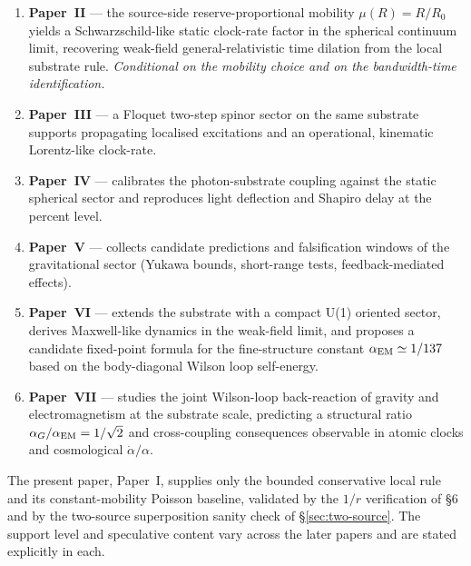 \documentclass[11pt,a4paper]{article}
\begin{document}
\begin{enumerate}
\item \textbf{Paper~II} --- the source-side reserve-proportional
mobility $\mu(R) = R/R_0$ yields a Schwarzschild-like static
clock-rate factor in the spherical continuum limit, recovering
weak-field general-relativistic time dilation from the local
substrate rule. \emph{Conditional on the mobility choice and
on the bandwidth-time identification.}
\item \textbf{Paper~III} --- a Floquet two-step spinor sector
on the same substrate supports propagating localised
excitations and an operational, kinematic Lorentz-like
clock-rate.
\item \textbf{Paper~IV} --- calibrates the photon-substrate
coupling against the static spherical sector and reproduces
light deflection and Shapiro delay at the percent level.
\item \textbf{Paper~V} --- collects candidate predictions and
falsification windows of the gravitational sector (Yukawa
bounds, short-range tests, feedback-mediated effects).
\item \textbf{Paper~VI} --- extends the substrate with a
compact U(1) oriented sector, derives Maxwell-like dynamics in
the weak-field limit, and proposes a candidate fixed-point
formula for the fine-structure constant
$\alpha_{\rm EM} \simeq 1/137$ based on the body-diagonal
Wilson loop self-energy.
\item \textbf{Paper~VII} --- studies the joint Wilson-loop
back-reaction of gravity and electromagnetism at the substrate
scale, predicting a structural ratio
$\alpha_G/\alpha_{\rm EM} = 1/\sqrt{2}$ and cross-coupling
consequences observable in atomic clocks and cosmological
$\dot\alpha/\alpha$.
\end{enumerate}

The present paper, Paper~I, supplies only the bounded
conservative local rule and its constant-mobility Poisson
baseline, validated by the $1/r$ verification of \S6 and by
the two-source superposition sanity check of
\S\ref{sec:two-source}. The support level and speculative
content vary across the later papers and are stated explicitly
in each.



\end{document}
